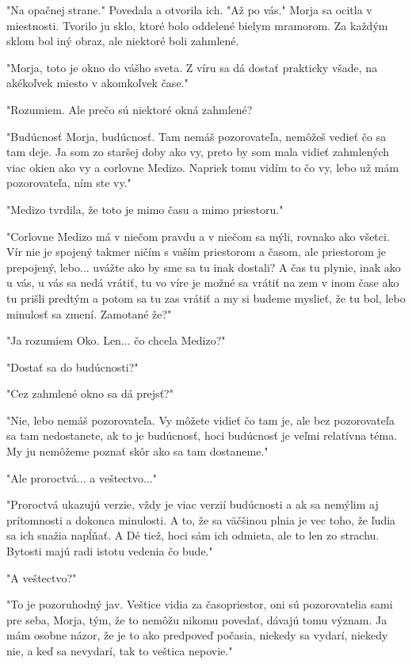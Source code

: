 \documentclass{book}
\begin{document}
"$ $Na opačnej strane."$ $ Povedala a otvorila ich. "$ $Až po vás."$ $ Morja sa ocitla v miestnosti. Tvorilo ju sklo, ktoré bolo oddelené bielym mramorom. Za každým sklom bol iný obraz, ale niektoré boli zahmlené.

"$ $Morja, toto je okno do vášho sveta. Z víru sa dá dostať prakticky všade, na akékoľvek miesto v akomkoľvek čase."

"$ $Rozumiem. Ale prečo sú niektoré okná zahmlené?

 "$ $Budúcnosť Morja, budúcnosť. Tam nemáš pozorovateľa, nemôžeš vedieť čo sa tam deje. Ja som zo staršej doby ako vy, preto by som mala vidieť zahmlených viac okien ako vy a corlovne Medizo. Napriek tomu vidím to čo vy, lebo už mám pozorovateľa, ním ste vy."

"$ $Medizo tvrdila, že toto je mimo času a mimo priestoru."

"$ $Corlovne Medizo má v niečom pravdu a v niečom sa mýli, rovnako ako všetci. Vír nie je spojený takmer ničím s vaším priestorom a časom, ale priestorom je prepojený, lebo... uvážte ako by sme sa tu inak dostali? A čas tu plynie, inak ako u vás, u vás sa nedá vrátiť, tu vo víre je možné sa vrátiť na zem v inom čase ako tu prišli predtým a potom sa tu zas vrátiť a my si budeme myslieť, že tu bol, lebo minulosť sa zmení. Zamotané že?"

"$ $Ja rozumiem Oko. Len... čo chcela Medizo?"

"$ $Dostať sa do budúcnosti?"

"$ $Cez zahmlené okno sa dá prejsť?"

"$ $Nie, lebo nemáš pozorovateľa. Vy môžete vidieť čo tam je, ale bez pozorovateľa sa tam nedostanete, ak to je budúcnosť, hoci budúcnosť je veľmi relatívna téma. My ju nemôžeme poznať skôr ako sa tam dostaneme."

"$ $Ale proroctvá... a veštectvo..."

"$ $Proroctvá ukazujú verzie, vždy je viac verzií budúcnosti a ak sa nemýlim aj prítomnosti a dokonca minulosti. A to, že sa väčšinou plnia je vec toho, že ľudia sa ich snažia napĺňať. A Dé tiež, hoci sám ich odmieta, ale to len zo strachu. Bytosti majú radi istotu vedenia čo bude."

"$ $A veštectvo?"

"$ $To je pozoruhodný jav. Veštice vidia za časopriestor, oni sú pozorovatelia sami pre seba, Morja, tým, že to nemôžu nikomu povedať, dávajú tomu význam. Ja mám osobne názor, že je to ako predpoveď počasia, niekedy sa vydarí, niekedy nie, a keď sa nevydarí, tak to veštica nepovie."
\end{document}
